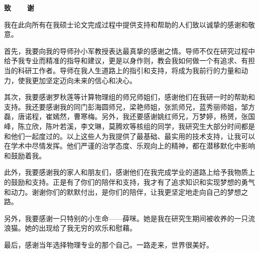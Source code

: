 \newpage
\thispagestyle{empty}
\fontsize{12pt}{13pt}\selectfont
\begin{center}\label{zhixie}
	{\xiaoerhao\textbf{致~~~~谢}}
\end{center}

\begin{flushleft}
\setlength{\parindent}{2em}
\hspace{1.6em}
我在此向所有在我硕士论文完成过程中提供支持和帮助的人们致以诚挚的感谢和敬意。

首先，我要向我的导师孙小军教授表达最真挚的感谢之情。导师不仅在研究过程中给予我专业而精准的指导和建议，更是以身作则，教会我如何做一个有追求、有担当的科研工作者。导师在我人生道路上的指引和支持，将成为我前行的力量和动力，使我更加坚定迈向未来的信心和决心。

其次，我要感谢罗秋莲等计算物理组的师兄师姐们，感谢他们在我研一时的帮助和支持。我还要感谢我的同门彭海圆师兄，梁艳师姐，张凯师兄，蓝秀丽师姐，邹方磊，唐诺程，崔嫣然，曹寒梅。另外，我还要感谢姚红师兄，万梦婷，杨赟，张国峰，陈立欣，陈叶若溪，李文琳，莫腾欢等核组的同学，我研究生大部分时间都是和他们一起度过的。以上这些人为我提供了最基础、最实用的技术支持，让我可以在学术中尽情发挥。他们严谨的治学态度、乐观向上的精神，都在潜移默化中影响和鼓励着我。

此外，我要感谢我的家人和朋友们，感谢他们在我完成学业的道路上给予我物质上的鼓励和支持。正是有了你们的陪伴和支持，我才有了追求知识和实现梦想的勇气和动力。谢谢你们的默默付出，是你们的陪伴，让我更坚定地走向自己的梦想之路。

另外，我要感谢一只特别的小生命——薛咪。她是我在研究生期间被收养的一只流浪猫。她的出现给了我无穷的欢乐和慰藉。

最后，感谢当年选择物理专业的那个自己。一路走来，世界很美好。
\end{flushleft}


